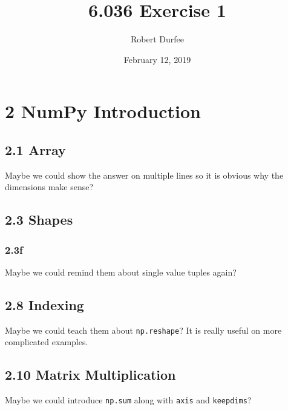 \documentclass{article}
\title{6.036 Exercise 1}
\author{Robert Durfee}
\date{February 12, 2019}
\begin{document}
\maketitle

\section*{2 NumPy Introduction}

\subsection*{2.1 Array}

Maybe we could show the answer on multiple lines so it is obvious why the
dimensions make sense?

\subsection*{2.3 Shapes}

\subsubsection*{2.3f}

Maybe we could remind them about single value tuples again?

\subsection*{2.8 Indexing}

Maybe we could teach them about \texttt{np.reshape}? It is really useful on
more complicated examples.

\subsection*{2.10 Matrix Multiplication}

Maybe we could introduce \texttt{np.sum} along with \texttt{axis} and
\texttt{keepdims}?
\end{document}
